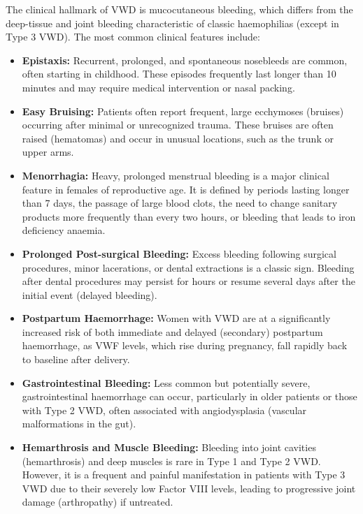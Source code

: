 The clinical hallmark of VWD is mucocutaneous bleeding, which differs from the deep-tissue and joint bleeding characteristic of classic haemophilias (except in Type 3 VWD). The most common clinical features include:
\begin{itemize}
    \item \textbf{Epistaxis:} Recurrent, prolonged, and spontaneous nosebleeds are common, often starting in childhood. These episodes frequently last longer than 10 minutes and may require medical intervention or nasal packing.
    \item \textbf{Easy Bruising:} Patients often report frequent, large ecchymoses (bruises) occurring after minimal or unrecognized trauma. These bruises are often raised (hematomas) and occur in unusual locations, such as the trunk or upper arms.
    \item \textbf{Menorrhagia:} Heavy, prolonged menstrual bleeding is a major clinical feature in females of reproductive age. It is defined by periods lasting longer than 7 days, the passage of large blood clots, the need to change sanitary products more frequently than every two hours, or bleeding that leads to iron deficiency anaemia.
    \item \textbf{Prolonged Post-surgical Bleeding:} Excess bleeding following surgical procedures, minor lacerations, or dental extractions is a classic sign. Bleeding after dental procedures may persist for hours or resume several days after the initial event (delayed bleeding).
    \item \textbf{Postpartum Haemorrhage:} Women with VWD are at a significantly increased risk of both immediate and delayed (secondary) postpartum haemorrhage, as VWF levels, which rise during pregnancy, fall rapidly back to baseline after delivery.
    \item \textbf{Gastrointestinal Bleeding:} Less common but potentially severe, gastrointestinal haemorrhage can occur, particularly in older patients or those with Type 2 VWD, often associated with angiodysplasia (vascular malformations in the gut).
    \item \textbf{Hemarthrosis and Muscle Bleeding:} Bleeding into joint cavities (hemarthrosis) and deep muscles is rare in Type 1 and Type 2 VWD. However, it is a frequent and painful manifestation in patients with Type 3 VWD due to their severely low Factor VIII levels, leading to progressive joint damage (arthropathy) if untreated.
\end{itemize}

